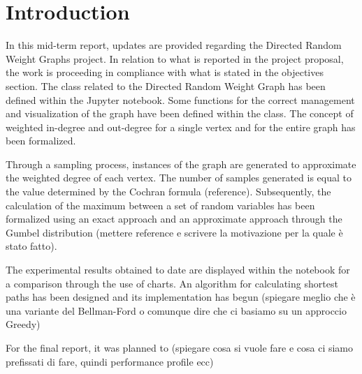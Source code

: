 \section{Introduction}
In this mid-term report, updates are provided regarding the Directed Random Weight Graphs project. In relation to what is reported in the project proposal, the work is proceeding in compliance with what is stated in the objectives section. 
The class related to the Directed Random Weight Graph has been defined within the Jupyter notebook. Some functions for the correct management and visualization of the graph have been defined within the class.
The concept of weighted in-degree and out-degree for a single vertex and for the entire graph has been formalized.

Through a sampling process, instances of the graph are generated to approximate the weighted degree of each vertex. The number of samples generated is equal to the value determined by the Cochran formula (reference).
Subsequently, the calculation of the maximum between a set of random variables has been formalized using an exact approach and an approximate approach through the Gumbel distribution (mettere reference e scrivere la motivazione per la quale è stato fatto). 

The experimental results obtained to date are displayed within the notebook for a comparison through the use of charts. 
An algorithm for calculating shortest paths has been designed and its implementation has begun (spiegare meglio che è una variante del Bellman-Ford o comunque dire che ci basiamo su un approccio Greedy) 

For the final report, it was planned to (spiegare cosa si vuole fare e cosa ci siamo prefissati di fare, quindi performance profile ecc) 